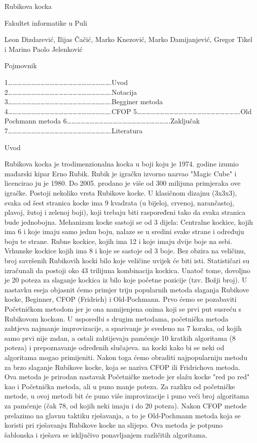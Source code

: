 Rubikova kocka







Fakultet informatike u Puli




Leon Dizdarević, Ilijas Čačić, Marko Knezović, Marko Damijanjević, Gregor Tikel i Marino Paolo Jelenković





Pojmovnik


1………………………………………………………….Uvod
2………………………………………………………….Notacija
3………………………………………………………….Begginer metoda
4………………………………………………………….CFOP
5………………………………………………………….Old Pochmann metoda
6………………………………………………………….Zaključak
7………………………………………………………….Literatura








Uvod

Rubikova kocka je trodimenzionalna kocka u boji koju je 1974. godine izumio mađarski kipar Erno Rubik. Rubik je igračku izvorno nazvao "Magic Cube" i licencirao ju je 1980. Do 2005. prodano je više od 300 milijuna primjeraka ove igračke. Postoji nekoliko vrsta Rubikove kocke. U klasičnom dizajnu (3x3x3), svaka od šest stranica kocke ima 9 kvadrata (u bijeloj, crvenoj, narančastoj, plavoj, žutoj i zelenoj boji), koji trebaju biti raspoređeni tako da svaka stranica bude jednobojna. Mehanizam kocke sastoji se od 3 dijela: Centralne kockice, kojih ima 6 i koje imaju samo jednu boju, nalaze se u sredini svake strane i određuju boju te strane. Rubne kockice, kojih ima 12 i koje imaju dvije boje na sebi. Vrhunske kockice kojih ima 8 i koje se sastoje od 3 boje. Bez obzira na veličinu, broj savršenih Rubikovih kocki bilo koje veličine uvijek će biti isti. Statističari su izračunali da postoji oko 43 trilijuna kombinacija kockica. Unatoč tome, dovoljno je 20 poteza za slaganje kockica iz bilo koje početne pozicije (tzv. Božji broj). U nastavku eseja objasnit ćemo primjer triju popularnih metoda slaganja Rubikove kocke, Beginner, CFOP (Fridrich) i Old-Pochmann. Prvo ćemo se pozabaviti Početničkom metodom jer je ona namijenjena onima koji se prvi put susreću s Rubikovom kockom. U usporedbi s drugim metodama, početnička metoda zahtjeva najmanje improvizacije, a sparivanje je svedeno na 7 koraka, od kojih samo prvi nije zadan, a ostali zahtijevaju pamćenje 10 kratkih algoritama (8 poteza) i prepoznavanje određenih slučajeva. na kocki kako bi se neki od algoritama mogao primijeniti. Nakon toga ćemo obraditi najpopularniju metodu za brzo slaganje Rubikove kocke, koja se naziva CFOP ili Fridrichova metoda. Ova metoda je prirodan nastavak Početničke metode jer slažu kocke "red po red" kao i Početnička metoda, ali u puno manje poteza. Za razliku od početničke metode, u ovoj metodi bit će puno više improvizacije i puno veći broj algoritama za pamćenje (čak 78, od kojih neki imaju i do 20 poteza). Nakon CFOP metode prelazimo na glavnu taktiku rješavanja, a to je Old-Pochmann metoda koja se koristi pri rješavanju Rubikove kocke na slijepo. Ova metoda je potpuno šablonska i rješava se isključivo ponavljanjem različitih algoritama.


